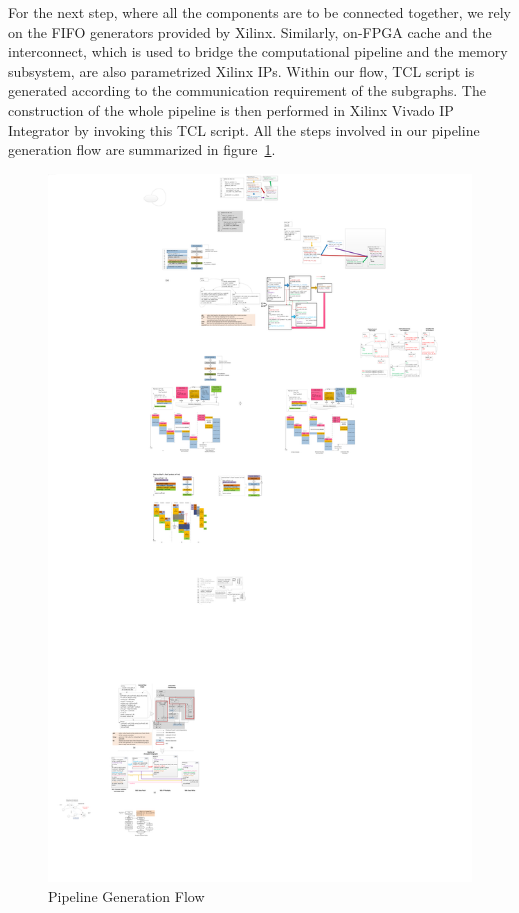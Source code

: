 For the next step, where all the components are to be connected
together, we rely on the FIFO generators provided by Xilinx.
Similarly, on-FPGA cache and the
interconnect, which is used to bridge the computational pipeline
and the memory subsystem, are also parametrized Xilinx IPs. 
Within our flow, TCL script is generated according to the communication requirement of the subgraphs. The construction of the whole pipeline
is then performed in Xilinx Vivado IP Integrator by invoking this TCL script.
All the steps involved in our
pipeline generation flow are summarized in figure~\ref{fig:allsteps}.
\begin{figure}[htp]
\begin{center}
\includegraphics[width=0.8\linewidth]{chap3fig/flowSteps.pdf}
\caption{Pipeline Generation Flow
\label{fig:allsteps}}
\end{center}
\end{figure}

